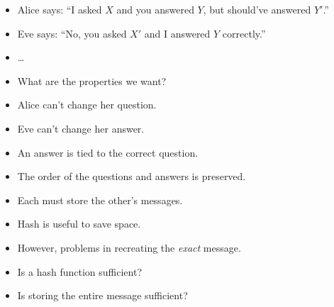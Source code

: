 \begin{frame}
  \begin{exercise}
    \begin{itemize}
      \item Alice says: \enquote{I asked \(X\) and you answered \(Y\),
        but should've answered \(Y'\).}
      \item Eve says: \enquote{No, you asked \(X'\) and I answered \(Y\) 
        correctly.}
      \item \dots
    \end{itemize}
  \end{exercise}

  \begin{question}
    \begin{itemize}
      \item What are the properties we want?
    \end{itemize}
  \end{question}

  \pause

  \begin{solution}
    \begin{itemize}
      \item Alice can't change her question.
      \item Eve can't change her answer.
      \item An answer is tied to the correct question.
      \item The order of the questions and answers is preserved.
    \end{itemize}
  \end{solution}
\end{frame}

\begin{frame}
  \begin{solution}
    \begin{itemize}
      \item Each must store the other's messages.
      \item Hash is useful to save space.
      \item However, problems in recreating the \emph{exact} message.
    \end{itemize}
  \end{solution}

  \pause

  \begin{question}
    \begin{itemize}
      \item Is a hash function sufficient?
      \item Is storing the entire message sufficient?
    \end{itemize}
  \end{question}
\end{frame}

